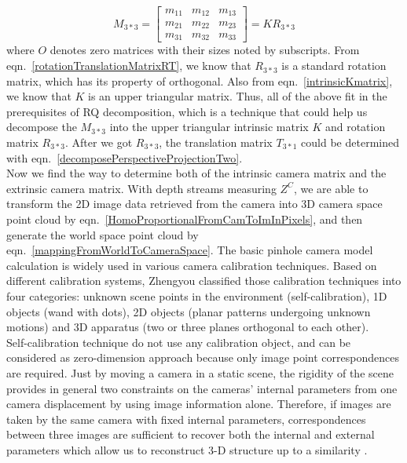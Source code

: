 \begin{equation}
M_{3*3} =
\begin{bmatrix} 
m_{11} & m_{12} & m_{13} \\
m_{21} & m_{22} & m_{23} \\
m_{31} & m_{32} & m_{33}  
\end{bmatrix}%
=
KR_{3*3}
\label{QRdecompositionEquation}
\end{equation}%
\noindent
where \(O\) denotes zero matrices with their sizes noted by subscripts. From eqn.~\ref{rotationTranslationMatrixRT}, we know that \(R_{3*3}\) is a standard rotation matrix, which has its property of orthogonal. Also from eqn.~\ref{intrinsicKmatrix}, we know that \(K\) is an upper triangular matrix. Thus, all of the above fit in the prerequisites of RQ decomposition, which is a technique that could help us decompose the \(M_{3*3}\) into the upper triangular intrinsic matrix \(K\) and rotation matrix \(R_{3*3}\). After we got \(R_{3*3}\), the translation matrix \(T_{3*1}\) could be determined with eqn.~\ref{decomposePerspectiveProjectionTwo}.
\\\indent%
%
Now we find the way to determine both of the intrinsic camera matrix and the extrinsic camera matrix. With depth streams measuring \(Z^C\), we are able to transform the 2D image data retrieved from the camera into 3D camera space point cloud by eqn.~\ref{HomoProportionalFromCamToImInPixels}, and then generate the world space point cloud by eqn.~\ref{mappingFromWorldToCameraSpace}. The basic pinhole camera model calculation is widely used in various camera calibration techniques. Based on different calibration systems, Zhengyou \cite{Zhengyou04} classified those calibration techniques into four categories: unknown scene points in the environment (self-calibration), 1D objects (wand with dots), 2D objects (planar patterns undergoing unknown motions) and 3D apparatus (two or three planes orthogonal to each other). 
\\\indent
Self-calibration technique do not use any calibration object, and can be considered as zero-dimension approach because only image point correspondences are required. Just by moving a camera in a static scene, the rigidity of the scene provides in general two constraints \cite{selfCalibration3_1992} on the cameras’ internal parameters from one camera displacement by using image information alone. Therefore, if images are taken by the same camera with fixed internal parameters, correspondences between three images are sufficient to recover both the internal and external parameters which allow us to reconstruct 3-D structure up to a similarity \cite{selfCalibration2_1997} \cite{selfCalibration1_1994}. 
